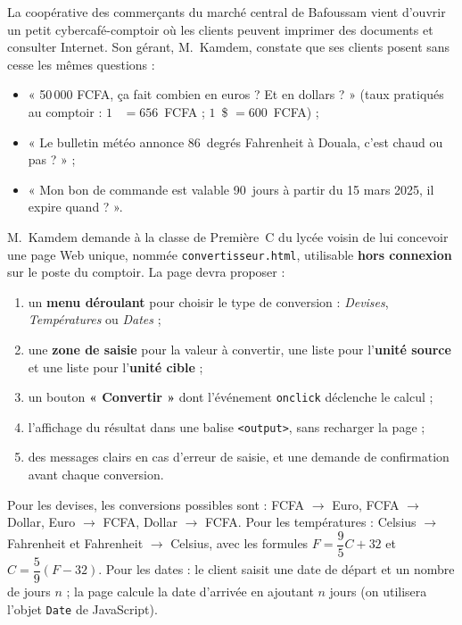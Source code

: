 \documentclass[11pt]{article}
\newcommand{\cle}[1]{{\popxbold\color{popdark}#1}}
\newcounter{popsec}
\newcounter{popsub}
\newcommand{\courssub}[1]{%
  \stepcounter{popsub}%
  \par\vspace{9pt}\noindent{\popxbold\fontsize{11.5}{13}\selectfont\color{popink}{\color{poporange}\thepopsec.\thepopsub}\hspace{6pt}#1}\par\nopagebreak\vspace{4pt}
}
\begin{document}
\courssub{Situation}

La coopérative des commerçants du marché central de Bafoussam vient d'ouvrir un petit \cle{cybercafé-comptoir} où les clients peuvent imprimer des documents et consulter Internet. Son gérant, M.~Kamdem, constate que ses clients posent sans cesse les mêmes questions :

\begin{itemize}
\item « 50\,000 FCFA, ça fait combien en euros ? Et en dollars ? » (taux pratiqués au comptoir : $1$~\texteuro{} $= 656$~FCFA ; $1$~\$ $= 600$~FCFA) ;
\item « Le bulletin météo annonce 86~degrés Fahrenheit à Douala, c'est chaud ou pas ? » ;
\item « Mon bon de commande est valable 90~jours à partir du 15 mars 2025, il expire quand ? ».
\end{itemize}

M.~Kamdem demande à la classe de Première~C du lycée voisin de lui concevoir une page Web unique, nommée \texttt{convertisseur.html}, utilisable \textbf{hors connexion} sur le poste du comptoir. La page devra proposer :

\begin{enumerate}
\item un \textbf{menu déroulant} pour choisir le type de conversion : \emph{Devises}, \emph{Températures} ou \emph{Dates} ;
\item une \textbf{zone de saisie} pour la valeur à convertir, une liste pour l'\textbf{unité source} et une liste pour l'\textbf{unité cible} ;
\item un bouton \textbf{« Convertir »} dont l'événement \texttt{onclick} déclenche le calcul ;
\item l'affichage du résultat dans une balise \texttt{<output>}, sans recharger la page ;
\item des messages clairs en cas d'erreur de saisie, et une demande de confirmation avant chaque conversion.
\end{enumerate}

Pour les devises, les conversions possibles sont : FCFA $\rightarrow$ Euro, FCFA $\rightarrow$ Dollar, Euro $\rightarrow$ FCFA, Dollar $\rightarrow$ FCFA. Pour les températures : Celsius $\rightarrow$ Fahrenheit et Fahrenheit $\rightarrow$ Celsius, avec les formules $F = \dfrac{9}{5}C + 32$ et $C = \dfrac{5}{9}(F - 32)$. Pour les dates : le client saisit une date de départ et un nombre de jours $n$ ; la page calcule la date d'arrivée en ajoutant $n$ jours (on utilisera l'objet \texttt{Date} de JavaScript).
\end{document}
